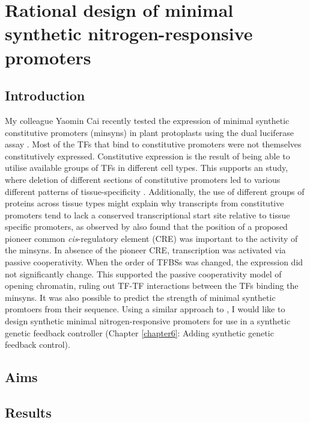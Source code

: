 \documentclass[../main.tex]{subfiles}
\begin{document}
\chapter{Rational design of minimal synthetic nitrogen-responsive promoters}\label{chapter5}
\section{Introduction}\label{chapter5:introduction}
My colleague Yaomin Cai recently tested the expression of minimal synthetic constitutive promoters (minsyns) in plant protoplasts using the dual luciferase assay \autocite{caiRationalDesignMinimal2020}.
Most of the TFs that bind to constitutive promoters were not themselves constitutively expressed.
Constitutive expression is the result of being able to utilise available groups of TFs in different cell types.
This supports an study, where deletion of different sections of constitutive promoters led to various different patterns of tissue-specificity \autocite{benfeyTissuespecificExpressionCaMV1990}.
Additionally, the use of different groups of proteins across tissue types might explain why transcripts from constitutive promoters tend to lack a conserved transcriptional start site relative to tissue specific promoters, as observed by %
\textcite*{caiRationalDesignMinimal2020} also found that the position of a proposed pioneer common \textit{cis}\hyp{}regulatory element (CRE) was important to the activity of the minsyns.
In absence of the pioneer CRE, transcription was activated via passive cooperativity.
When the order of TFBSs was changed, the expression did not significantly change.
This supported the passive cooperativity model of opening chromatin, ruling out TF-TF interactions between the TFs binding the minsyns.
It was also possible to predict the strength of minimal synthetic promtoers from their sequence.
Using a similar approach to \textcite*{caiRationalDesignMinimal2020}, I would like to design synthetic minimal nitrogen-responsive promoters for use in a synthetic genetic feedback controller (Chapter \ref{chapter6}: Adding synthetic genetic feedback control).
\section{Aims}\label{chapter5:aims}
\section{Results}\label{chapter5:results}
\end{document}
